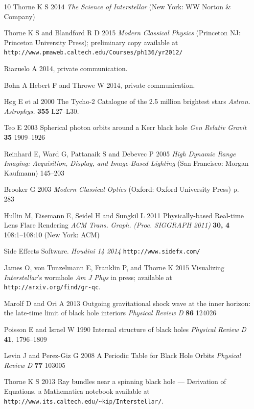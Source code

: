 \documentclass[12pt]{iopart}
\begin{document}
\begin{thebibliography}{10}
 Thorne K S 2014 {\it The Science of Interstellar} (New York: WW Norton \& Company)

 Thorne K S and Blandford R D 2015 {\it Modern Classical Physics}
(Princeton NJ: Princeton University Press); preliminary copy available at 
\verb"http://www.pmaweb.caltech.edu/Courses/ph136/yr2012/"

 Riazuelo A 2014, private communication.

 Bohn A Hebert F and Throwe W 2014, private communication.

 H{\o}g E et al 2000 The Tycho-2 Catalogue of the 2.5 million brightest stars {\it Astron. Astrophys.} {\bf 355} L27--L30.

 Teo E 2003 Spherical photon orbits around a Kerr black hole {\it Gen Relativ Gravit} {\bf 35} 1909--1926

 Reinhard E, Ward G, Pattanaik S and Debevec P 2005
{\it High Dynamic Range Imaging: Acquisition, Display, and Image-Based Lighting} (San Francisco: Morgan Kaufmann) 145--203 


 Brooker G 2003 {\it Modern Classical Optics} (Oxford: Oxford University Press) p. 283

 Hullin M,  Eisemann E,  Seidel H and Sungkil L 2011  Physically-based Real-time Lens Flare Rendering
 {\it ACM Trans. Graph. (Proc. SIGGRAPH 2011) } {\bf 30, 4} 108:1--108:10  (New York: ACM)

Side Effects Software. {\it Houdini 14 2014} \verb"http://www.sidefx.com/"

  James O, von Tunzelmann E, Franklin P, and Thorne K 2015 Visualizing \emph{Interstellar}'s wormhole {\it Am J Phys} in press; available at 
\verb"http://arxiv.org/find/gr-qc".

 Marolf D and Ori A 2013 Outgoing gravitational shock wave
at the inner horizon: the late-time limit of black hole interiors {\it Physical Review D}
{\bf 86} 124026

 Poisson E and Israel W 1990 Internal structure of black holes
{\it Physical Review D} {\bf 41}, 1796--1809

Levin J and Perez-Giz G 2008  A Periodic Table for Black Hole Orbits
\emph{Physical Review D} {\bf 77} 103005  

Thorne K S 2013 Ray bundles near a spinning black hole --- Derivation of Equations, a Mathematica notebook available at \verb"http://www.its.caltech.edu/~kip/Interstellar/".


\end{thebibliography}
\end{document}

